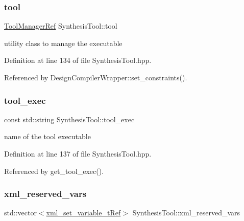 \mbox{\label{classSynthesisTool_a5da7778bdc9a72fc760f93f241da5ac5}} 
\subsubsection{\texorpdfstring{tool}{tool}}
{\footnotesize\ttfamily \hyperlink{ToolManager_8hpp_a785f6d5664e3a8bd974bc4afac02b73a}{Tool\+Manager\+Ref} Synthesis\+Tool\+::tool\hspace{0.3cm}{\ttfamily [protected]}}



utility class to manage the executable 



Definition at line 134 of file Synthesis\+Tool.\+hpp.



Referenced by Design\+Compiler\+Wrapper\+::set\+\_\+constraints().

\mbox{\label{classSynthesisTool_a78fd58496215c69838de4269204804a5}} 
\subsubsection{\texorpdfstring{tool\+\_\+exec}{tool\_exec}}
{\footnotesize\ttfamily const std\+::string Synthesis\+Tool\+::tool\+\_\+exec\hspace{0.3cm}{\ttfamily [protected]}}



name of the tool executable 



Definition at line 137 of file Synthesis\+Tool.\+hpp.



Referenced by get\+\_\+tool\+\_\+exec().

\mbox{\label{classSynthesisTool_ac55fea7c736345f7f6356cc31fc4f530}} 
\subsubsection{\texorpdfstring{xml\+\_\+reserved\+\_\+vars}{xml\_reserved\_vars}}
{\footnotesize\ttfamily std\+::vector$<$\hyperlink{xml__script__command_8hpp_a77453d591123aae088dbc1d0efe15f00}{xml\+\_\+set\+\_\+variable\+\_\+t\+Ref}$>$ Synthesis\+Tool\+::xml\+\_\+reserved\+\_\+vars\hspace{0.3cm}{\ttfamily [protected]}}



